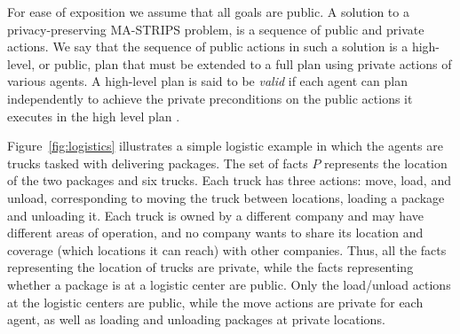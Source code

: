 \documentclass[letterpaper]{article}
\theoremstyle{definition}
\begin{document}
For ease of exposition we assume that all goals are public.
A solution to a privacy-preserving MA-STRIPS problem, is a sequence of public and private actions. We say that the sequence of public actions in such a solution is a high-level, or public, plan that must be extended to a full plan using private actions of various agents. A high-level plan is said to be {\em valid} if each agent can plan independently to achieve the private preconditions on the public actions it executes in the high level plan \cite{maliah2014privacyPreserving}.

Figure~\ref{fig:logistics} illustrates a simple logistic example in which the agents are trucks tasked with delivering packages. The set of facts $P$ represents the location of the two packages and six trucks. Each truck has three actions: move, load, and unload, corresponding to moving the truck between locations, loading a package and unloading it.
Each truck is owned by a different company and may have different areas of operation, and no company wants to share its location and coverage (which locations it can reach) with other companies. Thus, all the facts representing the location of trucks are private, while the facts representing whether a package is at a logistic center are public. Only the load/unload actions at the logistic centers are public, while the move actions are private for each agent, as well as loading and unloading packages at private locations.



\end{document}
